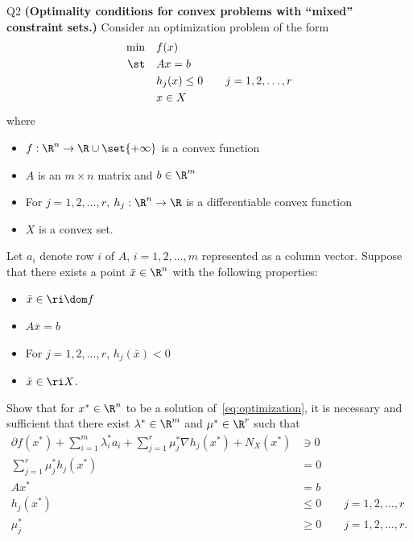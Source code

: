 \documentclass{article}
\theoremstyle{plain}
\theoremstyle{definition}
\theoremstyle{remark}
\begin{document}
\begin{problem}
    {Q2}
    {\bf (Optimality conditions for convex problems with ``mixed'' constraint sets.)}
    Consider an optimization problem of the form
    \begin{equation}
        \begin{aligned}
            \min & \quad f(x) \\
            \st & \quad Ax=b \\
            & \quad h_j(x)\leq 0 \qquad j=1,2,\dots,r \\
            & \quad x\in X
        \end{aligned}
        \label{eq:optimization}
    \end{equation}
    where
    \begin{itemize}
        \item $f:\R^n\rightarrow\R\cup\set{+\infty}$ is a convex function
        \item $A$ is an $m\times n$ matrix and $b\in\R^m$
        \item For $j=1,2,\dots,r$, $h_j:\R^n\rightarrow\R$ is a differentiable convex function
        \item $X$ is a convex set.
    \end{itemize}
    Let $a_i$ denote row $i$ of $A$, $i=1,2,\dots,m$ represented as a column vector. Suppose that there exists a point $\bar{x}\in\R^n$ with the following properties:
    \begin{itemize}
        \item $\bar{x}\in\ri\dom f$
        \item $A\bar{x}=b$
        \item For $j=1,2,\dots,r$, $h_j(\bar{x})<0$
        \item $\bar{x}\in\ri X$.
    \end{itemize}
    Show that for $x^*\in\R^n$ to be a solution of~\cref{eq:optimization}, it is necessary and sufficient that there exist $\lambda^*\in\R^m$ and $\mu^*\in\R^r$ such that
    \begin{align*}
        \partial f(x^*)+\sum_{i=1}^{m}\lambda^*_i a_i+\sum_{j=1}^{r}\mu^*_j\nabla h_j(x^*)+N_X(x^*) &\ni 0\\
        \sum_{j=1}^{r}\mu^*_j h_j(x^*) &= 0 \\
        Ax^* &= b \\
        h_j(x^*) &\leq 0 \qquad j=1,2,\dots,r \\
        \mu^*_j &\geq 0 \qquad j=1,2,\dots,r.
    \end{align*}
\end{problem}
\end{document}
